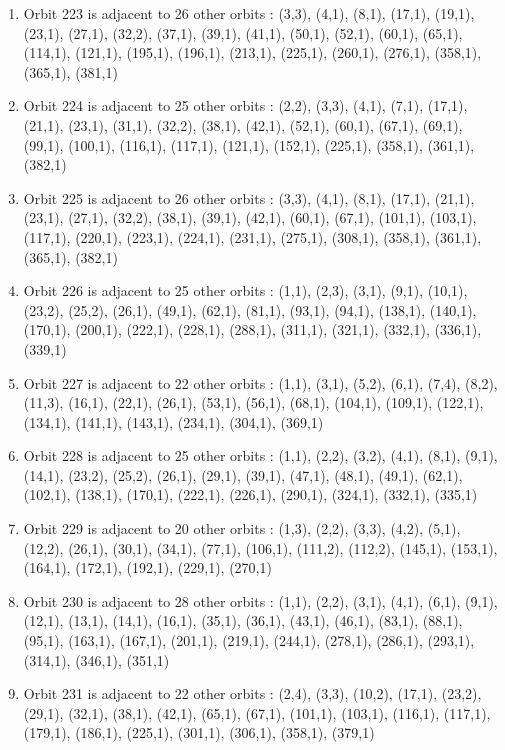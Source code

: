 \documentclass[12pt]{article}
\begin{document}
\begin{enumerate}
\item Orbit 223 is adjacent to 26 other orbits : (3,3), (4,1), (8,1), (17,1), (19,1), (23,1), (27,1), (32,2), (37,1), (39,1), (41,1), (50,1), (52,1), (60,1), (65,1), (114,1), (121,1), (195,1), (196,1), (213,1), (225,1), (260,1), (276,1), (358,1), (365,1), (381,1)
\item Orbit 224 is adjacent to 25 other orbits : (2,2), (3,3), (4,1), (7,1), (17,1), (21,1), (23,1), (31,1), (32,2), (38,1), (42,1), (52,1), (60,1), (67,1), (69,1), (99,1), (100,1), (116,1), (117,1), (121,1), (152,1), (225,1), (358,1), (361,1), (382,1)
\item Orbit 225 is adjacent to 26 other orbits : (3,3), (4,1), (8,1), (17,1), (21,1), (23,1), (27,1), (32,2), (38,1), (39,1), (42,1), (60,1), (67,1), (101,1), (103,1), (117,1), (220,1), (223,1), (224,1), (231,1), (275,1), (308,1), (358,1), (361,1), (365,1), (382,1)
\item Orbit 226 is adjacent to 25 other orbits : (1,1), (2,3), (3,1), (9,1), (10,1), (23,2), (25,2), (26,1), (49,1), (62,1), (81,1), (93,1), (94,1), (138,1), (140,1), (170,1), (200,1), (222,1), (228,1), (288,1), (311,1), (321,1), (332,1), (336,1), (339,1)
\item Orbit 227 is adjacent to 22 other orbits : (1,1), (3,1), (5,2), (6,1), (7,4), (8,2), (11,3), (16,1), (22,1), (26,1), (53,1), (56,1), (68,1), (104,1), (109,1), (122,1), (134,1), (141,1), (143,1), (234,1), (304,1), (369,1)
\item Orbit 228 is adjacent to 25 other orbits : (1,1), (2,2), (3,2), (4,1), (8,1), (9,1), (14,1), (23,2), (25,2), (26,1), (29,1), (39,1), (47,1), (48,1), (49,1), (62,1), (102,1), (138,1), (170,1), (222,1), (226,1), (290,1), (324,1), (332,1), (335,1)
\item Orbit 229 is adjacent to 20 other orbits : (1,3), (2,2), (3,3), (4,2), (5,1), (12,2), (26,1), (30,1), (34,1), (77,1), (106,1), (111,2), (112,2), (145,1), (153,1), (164,1), (172,1), (192,1), (229,1), (270,1)
\item Orbit 230 is adjacent to 28 other orbits : (1,1), (2,2), (3,1), (4,1), (6,1), (9,1), (12,1), (13,1), (14,1), (16,1), (35,1), (36,1), (43,1), (46,1), (83,1), (88,1), (95,1), (163,1), (167,1), (201,1), (219,1), (244,1), (278,1), (286,1), (293,1), (314,1), (346,1), (351,1)
\item Orbit 231 is adjacent to 22 other orbits : (2,4), (3,3), (10,2), (17,1), (23,2), (29,1), (32,1), (38,1), (42,1), (65,1), (67,1), (101,1), (103,1), (116,1), (117,1), (179,1), (186,1), (225,1), (301,1), (306,1), (358,1), (379,1)

\end{enumerate}
\end{document}
